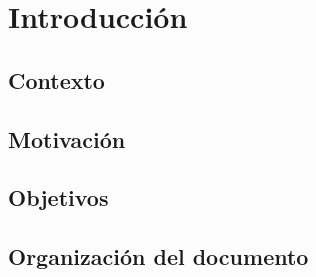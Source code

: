 \chapter{Introducción}
\label{capitulo1}


\section{Contexto}
\label{capitulo1:contexto}

\section{Motivación}
\label{capitulo1:motivacion}


\section{Objetivos}
\label{capitulo1:objetivos}

\section{Organización del documento}
\label{capitulo1:organizacion}